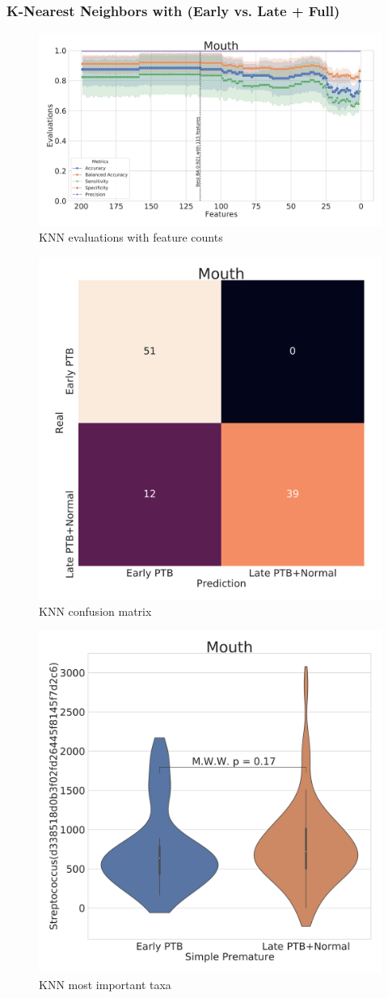 \documentclass{beamer}
\begin{document}
    \begin{frame}[allowframebreaks]
        \frametitle{K-Nearest Neighbors with (Early vs. Late + Full)}

        \begin{figure}
            \includegraphics[width=0.8 \linewidth]{figures/KNN/KNN-two.DADA2.homd/Mouth+metrics.pdf}
            \caption{KNN evaluations with feature counts}
        \end{figure}

        \begin{figure}
            \includegraphics[width=0.5 \linewidth]{figures/KNN/KNN-two.DADA2.homd/Mouth+heatmap.pdf}
            \caption{KNN confusion matrix}
        \end{figure}

        \begin{figure}
            \includegraphics[width=0.5 \linewidth]{figures/KNN/KNN-two.DADA2.homd/Mouth+Violin_0.pdf}
            \caption{KNN most important taxa}
        \end{figure}
    \end{frame}
\end{document}
